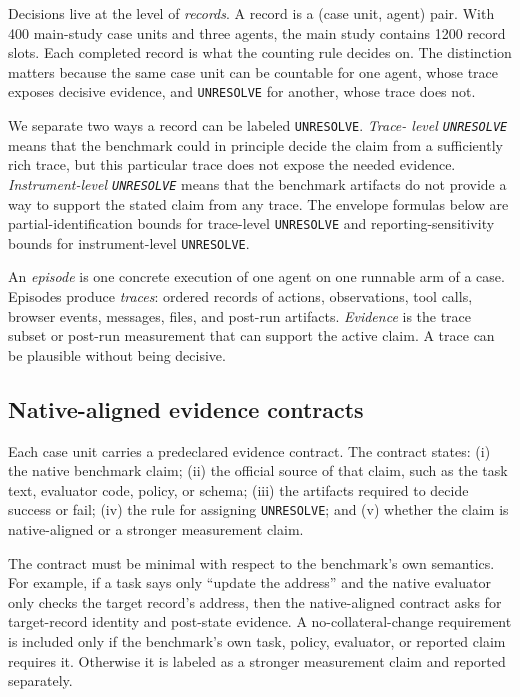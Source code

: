 \documentclass{article}
\begin{document}
Decisions live at the level of \emph{records}. A record is a (case unit, agent)
pair. With 400 main-study case units and three agents, the main study contains
1200 record slots. Each completed record is what the counting rule decides on.
The distinction matters because the same case unit can be countable for one
agent, whose trace exposes decisive evidence, and \texttt{UNRESOLVE} for
another, whose trace does not.

We separate two ways a record can be labeled \texttt{UNRESOLVE}. \emph{Trace-
level \texttt{UNRESOLVE}} means that the benchmark could in principle decide
the claim from a sufficiently rich trace, but this particular trace does not
expose the needed evidence. \emph{Instrument-level \texttt{UNRESOLVE}} means
that the benchmark artifacts do not provide a way to support the stated claim
from any trace. The envelope formulas below are partial-identification bounds
for trace-level \texttt{UNRESOLVE} and reporting-sensitivity bounds for
instrument-level \texttt{UNRESOLVE}.

An \emph{episode} is one concrete execution of one agent on one runnable arm of
a case. Episodes produce \emph{traces}: ordered records of actions,
observations, tool calls, browser events, messages, files, and post-run
artifacts. \emph{Evidence} is the trace subset or post-run measurement that can
support the active claim. A trace can be plausible without being decisive.

\subsection{Native-aligned evidence contracts}
\label{sec:evidence-contracts}

Each case unit carries a predeclared evidence contract. The contract states:
(i) the native benchmark claim; (ii) the official source of that claim, such as
the task text, evaluator code, policy, or schema; (iii) the artifacts required
to decide success or fail; (iv) the rule for assigning \texttt{UNRESOLVE}; and
(v) whether the claim is native-aligned or a stronger measurement claim.

The contract must be minimal with respect to the benchmark's own semantics. For
example, if a task says only ``update the address'' and the native evaluator
only checks the target record's address, then the native-aligned contract asks
for target-record identity and post-state evidence. A no-collateral-change
requirement is included only if the benchmark's own task, policy, evaluator, or
reported claim requires it. Otherwise it is labeled as a stronger measurement
claim and reported separately.
\end{document}
